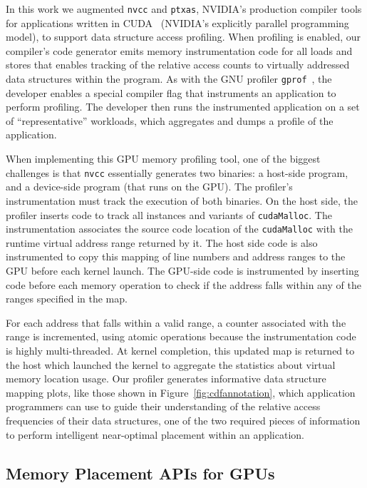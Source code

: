 In this work we augmented {\tt nvcc} and {\tt ptxas}, NVIDIA's
production compiler tools for applications written in CUDA~\cite{cuda} (NVIDIA’s
explicitly parallel programming model), to support data structure access
profiling.  When profiling is enabled, our compiler's code generator emits
memory instrumentation code for all loads and stores that enables tracking of
the relative access counts to virtually addressed data structures within the
program.  As with the GNU profiler {\tt gprof}~\cite{GPROF}, the developer
enables a special compiler flag that instruments an application to perform
profiling.  The developer then runs the instrumented application on a set of
``representative'' workloads, which aggregates and dumps a profile of the
application.  

When implementing this GPU memory profiling tool, one of the
biggest challenges is that {\tt nvcc} essentially generates two
binaries: a host-side program, and a device-side program (that runs on
the GPU).  The profiler's instrumentation must track the execution of
both binaries.  On the host side, the profiler inserts code to track
all instances and variants of {\tt cudaMalloc}.  The instrumentation
associates the source code location of the {\tt cudaMalloc} with the
runtime virtual address range returned by it.  The host side code is
also instrumented to copy this mapping of line numbers and address
ranges to the GPU before each kernel launch.  The GPU-side
code is instrumented by inserting code before each memory operation
to check if the address falls within any of the
ranges specified in the map.  

For each address that falls within a
valid range, a counter associated with the range is incremented, using
atomic operations because the instrumentation code is highly
multi-threaded.  At kernel completion, this updated map is
returned to the host which launched the kernel to aggregate the
statistics about virtual memory location usage. Our profiler generates
informative data structure mapping plots, like those shown in
Figure~\ref{fig:cdfannotation}, which application programmers can use
to guide their understanding of the relative access frequencies of
their data structures, one of the two required pieces of information
to perform intelligent near-optimal placement within an application.

\subsection{Memory Placement APIs for GPUs}
\label{api}

